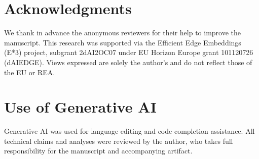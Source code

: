 \documentclass[sigconf]{acmart}
\begin{document}
\section*{Acknowledgments}
We thank in advance the anonymous reviewers for their help to improve the manuscript. This research was supported via the Efficient Edge Embeddings (E*3) project, subgrant 2dAI2OC07 under EU Horizon Europe grant 101120726 (dAIEDGE). Views expressed are solely the author's and do not reflect those of the EU or REA.

\section*{Use of Generative AI}
Generative AI was used for language editing and code-completion assistance. All technical claims and analyses were reviewed by the author, who takes full responsibility for the manuscript and accompanying artifact.

\balance



\end{document}
